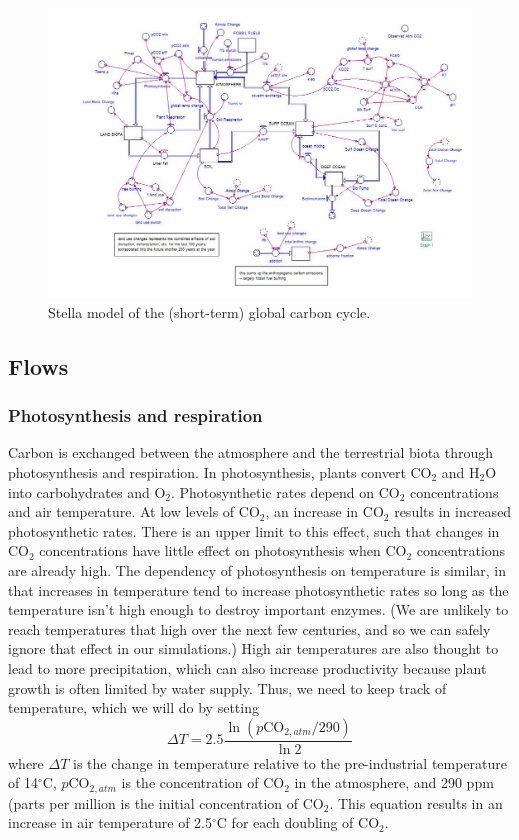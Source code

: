 \documentclass[11pt,letterpaper]{article}
\begin{document}
\begin{figure}
\includegraphics[width=\textheight]{./global_carbon_cycle_model.jpg}
\caption{Stella model of the (short-term) global carbon cycle.}
\label{fig:gcc}
\end{figure}

	
\subsection*{Flows}
\subsubsection*{Photosynthesis and respiration}
Carbon is exchanged between the atmosphere and the terrestrial biota through photosynthesis and respiration. In photosynthesis, plants convert CO$_2$ and H$_2$O into carbohydrates and O$_2$. Photosynthetic rates depend on CO$_2$ concentrations and air temperature. At low levels of CO$_2$, an increase in CO$_2$ results in increased photosynthetic rates. There is an upper limit to this effect, such that changes in CO$_2$ concentrations have little effect on photosynthesis when CO$_2$ concentrations are already high. The dependency of photosynthesis on temperature is similar, in that increases in temperature tend to increase photosynthetic rates so long as the temperature isn't high enough to destroy important enzymes. (We are unlikely to reach temperatures that high over the next few centuries, and so we can safely ignore that effect in our simulations.) High air temperatures are also thought to lead to more precipitation, which can also increase productivity because plant growth is often limited by water supply. Thus, we need to keep track of temperature, which we will do by setting
\begin{equation}
\Delta T = 2.5\frac{\ln(p\mbox{CO}_{2,atm}/290)}{\ln 2}
\end{equation}
where $\Delta T$ is the change in temperature relative to the pre-industrial temperature of 14$^\circ$C, $p\mbox{CO}_{2,atm}$ is the concentration of CO$_2$ in the atmosphere, and 290 ppm (parts per million is the initial concentration of CO$_2$. This equation results in an increase in air temperature of 2.5$^\circ$C for each doubling of CO$_2$.
\end{document}
